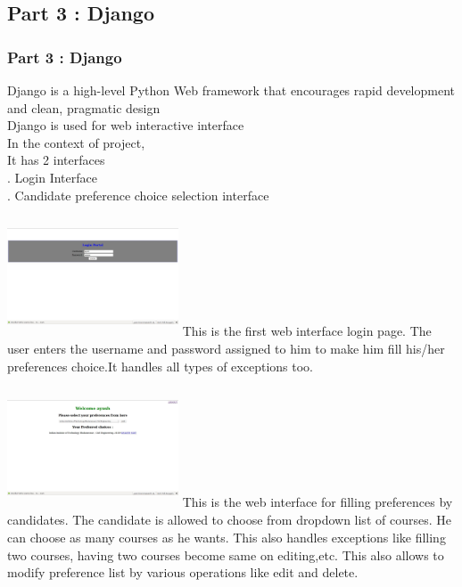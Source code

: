 \documentclass[]{beamer}%
\begin{document}
\subsection{Part 3 : Django }
\begin{frame}
\frametitle{Part 3 : Django}
Django is a high-level Python Web framework that encourages rapid development and clean, pragmatic design \\ \pause
Django is used for web interactive interface\\ \pause
In the context of project,  \\ \pause
It has 2 interfaces \\ . Login Interface \\ . Candidate preference choice selection interface



\end{frame}
\begin{frame}
\includegraphics[width = 2in,height = 1.4in]{login.jpg}
This is the first web interface login page. The user enters the username and password assigned to him to make him fill his/her preferences choice.It handles all types of exceptions too.
\end{frame}


\begin{frame}
\includegraphics[width = 2in,height = 1.4in]{result.jpg}
This is the web interface for filling preferences by candidates.
The candidate is allowed to choose from dropdown list of courses. He can choose as many courses as he wants.
This also handles exceptions like filling two courses, having two courses become same on editing,etc. 
This also allows to modify preference list by various operations like edit and delete.
\end{frame}
\end{document}
